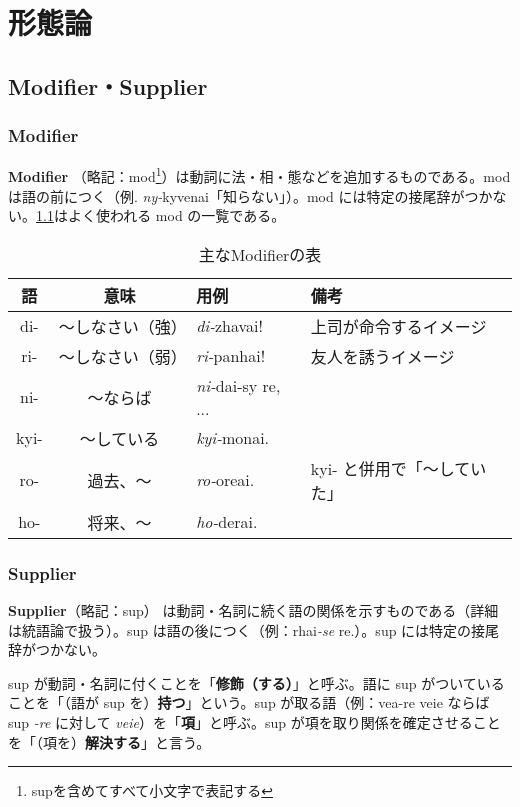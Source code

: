 \chapter{形態論}

\section{Modifier・Supplier}

\subsection{Modifier}
\textbf{Modifier} （略記：mod\footnote{supを含めてすべて小文字で表記する}）は動詞に法・相・態などを追加するものである。mod は語の前につく（例. \emph{ny-}kyvenai「知らない」）。mod には特定の接尾辞がつかない。\cref{table:common-mods}はよく使われる mod の一覧である。

\begin{table}[H]
    \centering
    \caption{主なModifierの表}
    \label{table:common-mods}
    \begin{tabular}{ccll}
        \toprule
        語 & 意味 & 用例 & 備考 \\
        \midrule
        di-  & ～しなさい（強） & \emph{di-}zhavai! & 上司が命令するイメージ \\
        ri-  & ～しなさい（弱） & \emph{ri-}panhai! & 友人を誘うイメージ\\
        ni-  & ～ならば   & \emph{ni-}dai-sy re, ...& \\
        kyi- & ～している & \emph{kyi-}monai. & \\
        ro-  & 過去、～   & \emph{ro-}oreai. & kyi- と併用で「～していた」\\
        ho-  & 将来、～   & \emph{ho-}derai. & \\
        \bottomrule
    \end{tabular}
\end{table}

\subsection{Supplier}

\textbf{Supplier}（略記：sup） は動詞・名詞に続く語の関係を示すものである（詳細は統語論で扱う）。sup は語の後につく（例：rhai\emph{-se} re.）。sup には特定の接尾辞がつかない。

sup が動詞・名詞に付くことを「\textbf{修飾（する）}」と呼ぶ。語に sup がついていることを「（語が sup を）\textbf{持つ}」という。sup が取る語（例：vea-re veie ならば sup \emph{-re} に対して \emph{veie}）を「\textbf{項}」と呼ぶ。sup が項を取り関係を確定させることを「（項を）\textbf{解決する}」と言う。

